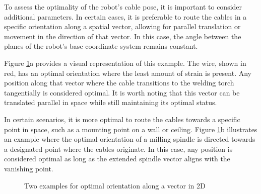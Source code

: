 To assess the optimality of the robot's cable pose, it is important to consider additional parameters. In certain cases, it is preferable to route the cables in a specific orientation along a spatial vector, allowing for parallel translation or movement in the direction of that vector. In this case, the angle between the planes of the robot's base coordinate system remains constant.

Figure \ref{OOPti}a provides a visual representation of this example. The wire, shown in red, has an optimal orientation where the least amount of strain is present. Any position along that vector where the cable transitions to the welding torch tangentially is considered optimal. It is worth noting that this vector can be translated parallel in space while still maintaining its optimal status.

In certain scenarios, it is more optimal to route the cables towards a specific point in space, such as a mounting point on a wall or ceiling. Figure \ref{OOPti}b illustrates an example where the optimal orientation of a milling spindle is directed towards a designated point where the cables originate. In this case, any position is considered optimal as long as the extended spindle vector aligns with the vanishing point.


\begin{figure}[H]%
	\centering
	\qquad
	\caption{Two examples for optimal orientation along a vector in 2D}%
	\label{OOPti}%
\end{figure}



